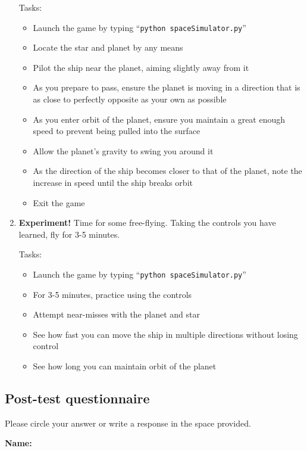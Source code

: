 \begin{enumerate}
  Tasks:
  \begin{itemize}
    \item Launch the game by typing ``\texttt{python spaceSimulator.py}''
    \item Locate the star and planet by any means
    \item Pilot the ship near the planet, aiming slightly away from it
    \item As you prepare to pass, ensure the planet is moving in a direction that is as close to perfectly opposite as your own as possible
    \item As you enter orbit of the planet, ensure you maintain a great enough speed to prevent being pulled into the surface
    \item Allow the planet's gravity to swing you around it
    \item As the direction of the ship becomes closer to that of the planet, note the increase in speed until the ship breaks orbit
    \item Exit the game
  \end{itemize}

  \item \textbf{Experiment!}  Time for some free-flying.  Taking the controls you have learned, fly for 3-5 minutes. 
  
  Tasks:
  \begin{itemize}
    \item Launch the game by typing ``\texttt{python spaceSimulator.py}''
    \item For 3-5 minutes, practice using the controls
    \item Attempt near-misses with the planet and star
    \item See how fast you can move the ship in multiple directions without losing control
    \item See how long you can maintain orbit of the planet
  \end{itemize}

\end{enumerate}

\subsection{Post-test questionnaire}

Please circle your answer or write a response in the space provided.

\vspace{5mm}
\noindent\textbf{Name:}

